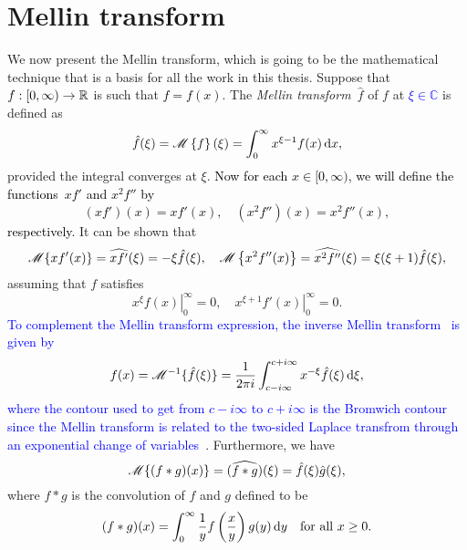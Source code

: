 \section{Mellin transform}
\label{subsec:mellin}
We now present the Mellin transform, which is going to be the mathematical technique that is a basis for all the work in this thesis. Suppose that $f : [0,\infty) \rightarrow \mathbb R$ is such that \textcolor{black}{$f = f(x)$}. The {\em Mellin transform}~$\hat f$ of $f$ at \textcolor{blue}{$\xi \in \mathbb{C}$} is defined as
\begin{equation*}
\hat f(\xi) =  \textcolor{black}{\mathscr M\left\{ f \right\}(\xi)} = \int_0^\infty x^{\xi - 1} f(x) \, \mathrm d x,
\end{equation*}
provided the integral converges at $\xi$. \textcolor{black}{Now for each $x \in [0,\infty)$, we will define the functions~$x f'$ and $x^2f''$ by
\begin{equation*}
(xf')(x) = x f'(x), \quad (x^2 f'')(x) = x^2 f''(x),
\end{equation*}
respectively.} It can be shown that \cite[pp. 362--363]{Myint1987}
\begin{equation}
\label{eqn:mellinDiv}
\mathscr M\{ xf'(x) \} = \widehat{x f'}(\xi) = -\xi \hat f(\xi), \quad \mathscr M\left\{ x^2f''(x) \right\} = \widehat{x^2 f''}(\xi) = \xi (\xi + 1) \hat f(\xi),
\end{equation}
assuming that $f$ satisfies
\begin{equation*}
\left. x^\xi f(x) \right\vert_0^\infty = 0, \quad \left. x^{\xi + 1} f'(x) \right\vert_0^\infty = 0.
\end{equation*}
\textcolor{blue}{To complement the Mellin transform expression, the inverse Mellin transform~\cite{Titchmarsh1948} is given by
\begin{equation*}
	f(x) = \mathscr M^{-1}\{\hat f(\xi)\} = \frac{1}{2\pi i} \int_{c-i\infty}^{c+i\infty} x^{-\xi}\hat f(\xi)  \, \mathrm d \xi,
\end{equation*}
where the contour used to get from $c - i\infty$ to $c + i\infty$ is the Bromwich contour since the Mellin transform is related to the two-sided Laplace transfrom through an exponential change of variables~\cite{Bracewell2000}}. Furthermore, we have
	\begin{equation*}
		\mathscr M\{ (f \ast g)(x) \} = (\widehat{f \ast g})(\xi) = \hat f(\xi) \hat g(\xi),
	\end{equation*}
where $f \ast g$ is the convolution of $f$ and $g$ defined to be
	\begin{equation*}
		(f \ast g)(x) = \int_0^\infty \frac{1}{y}f\left(\frac{x}{y}\right)g(y) \, \mathrm d y \quad \text{for all } x \geq 0.
	\end{equation*}
